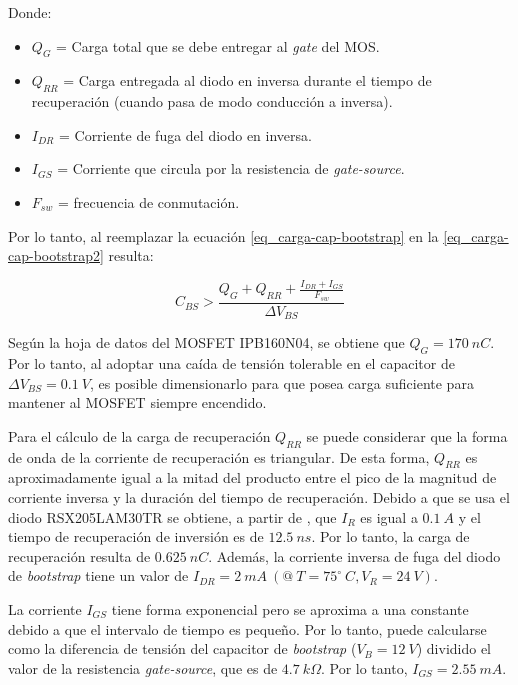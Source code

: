\noindent Donde:
\begin{itemize}
	\item $Q_G$ = Carga total que se debe entregar al \textsl{gate} del MOS.
	\item $Q_{RR}$ = Carga entregada al diodo en inversa durante el tiempo de recuperación (cuando pasa de modo conducción a inversa).
	\item $I_{DR}$ = Corriente de fuga del diodo en inversa.
	\item $I_{GS}$ = Corriente que circula por la resistencia de \textsl{gate-source}.
	\item $F_{sw}$ = frecuencia de conmutación.
\end{itemize}


\noindent Por lo tanto, al reemplazar la ecuación \ref{eq_carga-cap-bootstrap} en la \ref{eq_carga-cap-bootstrap2} resulta:


\begin{equation} \label{eq_cap-bootstrap}
	C_{BS} > \frac{Q_G+Q_{RR} + \frac{I_{DR}+I_{GS}}{F_{sw}}}{\Delta V_{BS}}
\end{equation}

\noindent Según la hoja de datos \cite{IPB160N04} del MOSFET IPB160N04, se obtiene que $Q_G= 170\:nC$. Por lo tanto, al adoptar una caída de tensión tolerable en el capacitor de $\Delta V_{BS} = 0.1\:V$, es posible dimensionarlo para que posea carga suficiente para mantener al MOSFET siempre encendido.

\noindent Para el cálculo de la carga de recuperación $Q_{RR}$ se puede considerar que la forma de onda de la corriente de recuperación es triangular. De esta forma,  $Q_{RR}$ es aproximadamente igual a la mitad del producto entre el pico de la magnitud de corriente inversa y la duración del tiempo de recuperación.  Debido a que se usa el diodo RSX205LAM30TR se obtiene, a partir de \cite{RSX205LAM30}, que  $I_R$ es igual a $0.1\:A$  y  el tiempo de recuperación de inversión es de $12.5\:ns$. Por lo tanto, la carga de recuperación resulta de $0.625\:nC$. Además, la corriente inversa de fuga del diodo de \textsl{bootstrap} tiene un valor de $I_{DR} =2 \:mA\:(@\: T=75^{\circ}\:C, V_R= 24\:V)$.

\noindent La corriente $I_{GS}$ tiene forma exponencial pero se aproxima a una constante debido a que el intervalo de tiempo es pequeño. Por lo tanto, puede calcularse como la diferencia de tensión del capacitor de \textsl{bootstrap} ($V_B=12\:V$) dividido el valor de la resistencia \textsl{gate-source}, que es de $4.7\:k\Omega$. Por lo tanto, $I_{GS}=2.55 \:mA$. 


